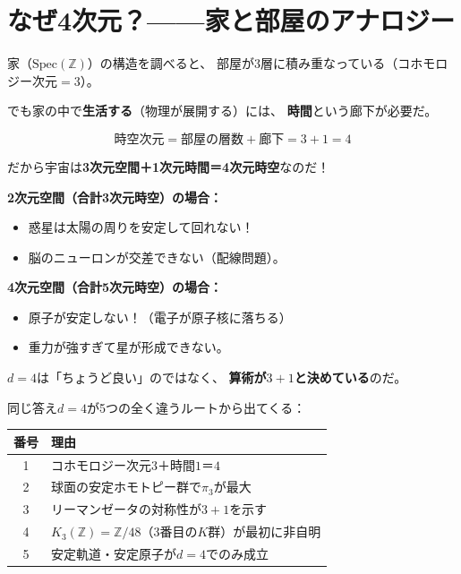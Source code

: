 \documentclass[12pt,a4paper]{article}
\begin{document}
\section{なぜ4次元？——家と部屋のアナロジー}

\begin{analogybox}[家のアナロジー]
家（$\mathrm{Spec}(\mathbb{Z})$）の構造を調べると、
部屋が3層に積み重なっている（コホモロジー次元$=3$）。

でも家の中で\textbf{生活する}（物理が展開する）には、
\textbf{時間}という廊下が必要だ。

\[
  \text{時空次元} = \text{部屋の層数} + \text{廊下} = 3 + 1 = 4
\]

だから宇宙は\textbf{3次元空間＋1次元時間＝4次元時空}なのだ！
\end{analogybox}

\begin{funbox}[もし次元が違ったら？]
\textbf{2次元空間（合計3次元時空）の場合：}
\begin{itemize}
\item 惑星は太陽の周りを安定して回れない！
\item 脳のニューロンが交差できない（配線問題）。
\end{itemize}

\textbf{4次元空間（合計5次元時空）の場合：}
\begin{itemize}
\item 原子が安定しない！（電子が原子核に落ちる）
\item 重力が強すぎて星が形成できない。
\end{itemize}

$d=4$は「ちょうど良い」のではなく、
\textbf{算術が$3+1$と決めている}のだ。
\end{funbox}

\begin{mathbox}[$d=4$の5つの理由]
同じ答え$d=4$が5つの全く違うルートから出てくる：

\begin{tabular}{cp{10cm}}
\toprule
番号 & 理由 \\
\midrule
1 & コホモロジー次元$3$＋時間$1$＝$4$ \\
2 & 球面の安定ホモトピー群で$\pi_3$が最大 \\
3 & リーマンゼータの対称性が$3+1$を示す \\
4 & $K_3(\mathbb{Z})=\mathbb{Z}/48$（3番目の$K$群）が最初に非自明 \\
5 & 安定軌道・安定原子が$d=4$でのみ成立 \\
\bottomrule
\end{tabular}
\end{mathbox}
\end{document}
